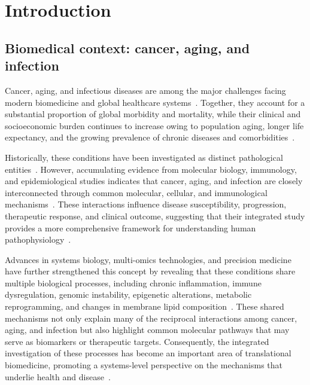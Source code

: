\chapter{Introduction}\label{chap:intro}

\newpage

\section{Biomedical context: cancer, aging, and infection}
Cancer, aging, and infectious diseases are among the major challenges facing modern biomedicine and global healthcare systems~\cite{WHO2024TopCausesDeath,GBD2021CausesOfDeath}. Together, they account for a substantial proportion of global morbidity and mortality, while their clinical and socioeconomic burden continues to increase owing to population aging, longer life expectancy, and the growing prevalence of chronic diseases and comorbidities~\cite{GBD2021CausesOfDeath}.

Historically, these conditions have been investigated as distinct pathological entities~\cite{Dolan2025}. However, accumulating evidence from molecular biology, immunology, and epidemiological studies indicates that cancer, aging, and infection are closely interconnected through common molecular, cellular, and immunological mechanisms~\cite{Hong2019}. These interactions influence disease susceptibility, progression, therapeutic response, and clinical outcome, suggesting that their integrated study provides a more comprehensive framework for understanding human pathophysiology~\cite{biology14010017}.

Advances in systems biology, multi-omics technologies, and precision medicine have further strengthened this concept by revealing that these conditions share multiple biological processes, including chronic inflammation, immune dysregulation, genomic instability, epigenetic alterations, metabolic reprogramming, and changes in membrane lipid composition~\cite{LopezOtin2023,hannah,Medzhitov2012}. These shared mechanisms not only explain many of the reciprocal interactions among cancer, aging, and infection but also highlight common molecular pathways that may serve as biomarkers or therapeutic targets. Consequently, the integrated investigation of these processes has become an important area of translational biomedicine, promoting a systems-level perspective on the mechanisms that underlie health and disease~\cite{LopezOtin2023,kennedy2014geroscience}.


